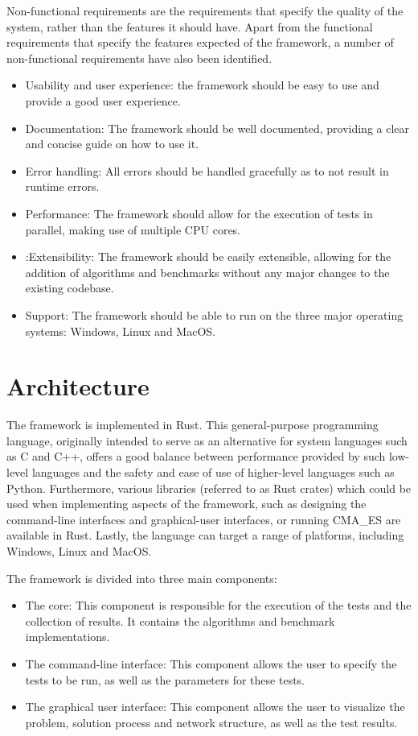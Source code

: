 Non-functional requirements are the requirements that specify the quality of the system, rather than the features it should have.
Apart from the functional requirements that specify the features expected of the framework, a number of non-functional requirements have also been identified.

\begin{itemize}
    \item Usability and user experience: the framework should be easy to use and provide a good user experience.
    \item Documentation: The framework should be well documented, providing a clear and concise guide on how to use it.
    \item Error handling: All errors should be handled gracefully as to not result in runtime errors.
    \item Performance: The framework should allow for the execution of tests in parallel, making use of multiple CPU cores.
    \item:Extensibility: The framework should be easily extensible, allowing for the addition of algorithms and benchmarks without any
    major changes to the existing codebase.
    \item Support: The framework should be able to run on the three major operating systems: Windows, Linux and MacOS.
\end{itemize}

\section{Architecture}

The framework is implemented in Rust. This general-purpose programming language, originally intended to serve as an alternative for system languages such as C and
C++, offers a good balance between performance provided by such low-level languages and the safety and ease of use of higher-level languages such as Python.
Furthermore, various libraries (referred to as Rust crates) which could be used when implementing aspects of the framework, such as designing the command-line interfaces
and graphical-user interfaces, or running CMA\_ES are available in Rust.
Lastly, the language can target a range of platforms, including Windows, Linux and MacOS.

The framework is divided into three main components:

\begin{itemize}
    \item The core: This component is responsible for the execution of the tests and the collection of results. It contains the algorithms and benchmark implementations.
    \item The command-line interface: This component allows the user to specify the tests to be run, as well as the parameters for these tests.
    \item The graphical user interface: This component allows the user to visualize the problem, solution process and network structure, as well as the test results.
\end{itemize}

